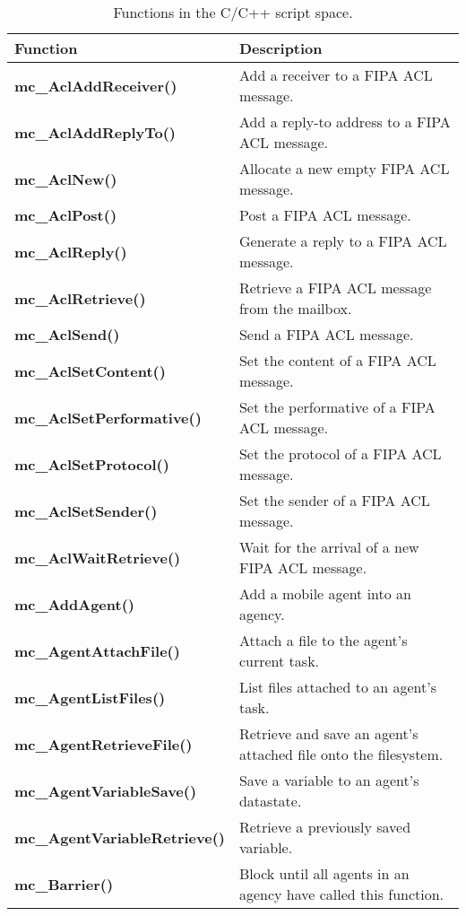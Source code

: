 \begin{table}[!h]
\capstart
\begin{center}
\caption{Functions in the C/C++ script space.}
\begin{tabular}{p{63 mm}p{97 mm}}
\hline
Function & Description \\
\hline
{\bf mc\_AclAddReceiver()} \dotfill & Add a receiver to a FIPA ACL message. \\
{\bf mc\_AclAddReplyTo()} \dotfill & Add a reply-to address to a FIPA ACL message. \\
{\bf mc\_AclNew()} \dotfill & Allocate a new empty FIPA ACL message. \\
{\bf mc\_AclPost()} \dotfill & Post a FIPA ACL message. \\
{\bf mc\_AclReply()} \dotfill & Generate a reply to a FIPA ACL message. \\
{\bf mc\_AclRetrieve()} \dotfill & Retrieve a FIPA ACL message from the mailbox. \\
{\bf mc\_AclSend()} \dotfill  &  Send a FIPA ACL message. \\
{\bf mc\_AclSetContent()} \dotfill  &  Set the content of a FIPA ACL message. \\
{\bf mc\_AclSetPerformative()} \dotfill  &  Set the performative of a FIPA ACL message. \\
{\bf mc\_AclSetProtocol()} \dotfill  &  Set the protocol of a FIPA ACL message. \\
{\bf mc\_AclSetSender()} \dotfill  &  Set the sender of a FIPA ACL message.\\
{\bf mc\_AclWaitRetrieve()} \dotfill  &  Wait for the arrival of a new FIPA ACL message. \\
{\bf mc\_AddAgent()} \dotfill  &  Add a mobile agent into an agency. \\
{\bf mc\_AgentAttachFile()} \dotfill & Attach a file to the agent's current task. \\
{\bf mc\_AgentListFiles()} \dotfill & List files attached to an agent's task. \\
{\bf mc\_AgentRetrieveFile()} \dotfill & Retrieve and save an agent's attached file onto the filesystem. \\
{\bf mc\_AgentVariableSave()} \dotfill  &  Save a variable to an agent's datastate. \\
{\bf mc\_AgentVariableRetrieve()} \dotfill  &  Retrieve a previously saved variable. \\
{\bf mc\_Barrier()} \dotfill  &  Block until all agents in an agency have called this function. \\

\end{tabular}
\end{center}
\end{table}
